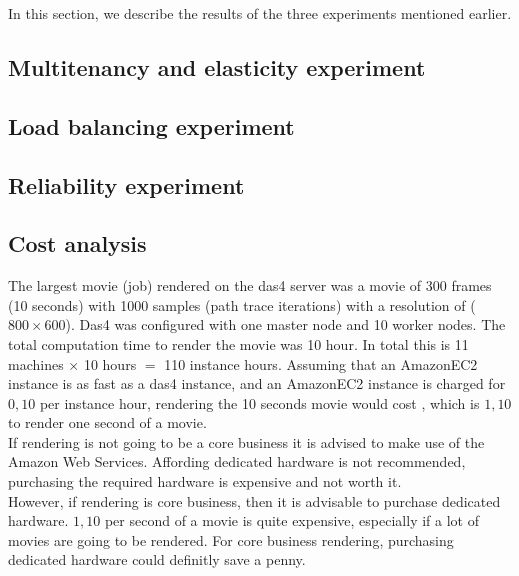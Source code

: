 In this section, we describe the results of the three experiments mentioned earlier.

\subsection{Multitenancy and elasticity experiment}

\subsection{Load balancing experiment}

\subsection{Reliability experiment}

\subsection{Cost analysis}
The largest movie (job) rendered on the das4 server was a movie of 300 frames (10 seconds) with 1000 samples (path trace iterations) with a resolution of ($800 \times 600$). Das4 was configured with one master node and 10 worker nodes. The total computation  time to render the movie was 10 hour. In total this is 11 machines $\times$ 10 hours $=$ 110 instance hours. Assuming that an AmazonEC2 instance is as fast as a das4 instance, and an AmazonEC2 instance is charged for \EUR$0,10$ per instance hour, rendering the 10 seconds movie would cost , which is \EUR$1,10$ to render one second of a movie.\\
If rendering is not going to be a core business it is advised to make use of the Amazon Web Services. Affording dedicated hardware is not recommended, purchasing the required hardware is expensive and not worth it.\\
However, if rendering is core business, then it is advisable to purchase dedicated hardware. \EUR$1,10$ per second of a movie is quite expensive, especially if a lot of movies are going to be rendered. For core business rendering, purchasing dedicated hardware could definitly save a penny.